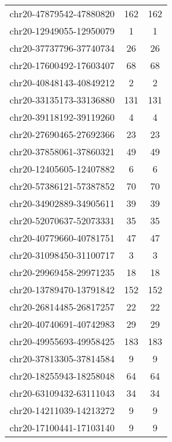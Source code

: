 \begin{longtable}{lSS}
	chr20-47879542-47880820 & 162    & 162                        \\
	chr20-12949055-12950079 & 1      & 1                          \\
	chr20-37737796-37740734 & 26     & 26                         \\
	chr20-17600492-17603407 & 68     & 68                         \\
	chr20-40848143-40849212 & 2      & 2                          \\
	chr20-33135173-33136880 & 131    & 131                        \\
	chr20-39118192-39119260 & 4      & 4                          \\
	chr20-27690465-27692366 & 23     & 23                         \\
	chr20-37858061-37860321 & 49     & 49                         \\
	chr20-12405605-12407882 & 6      & 6                          \\
	chr20-57386121-57387852 & 70     & 70                         \\
	chr20-34902889-34905611 & 39     & 39                         \\
	chr20-52070637-52073331 & 35     & 35                         \\
	chr20-40779660-40781751 & 47     & 47                         \\
	chr20-31098450-31100717 & 3      & 3                          \\
	chr20-29969458-29971235 & 18     & 18                         \\
	chr20-13789470-13791842 & 152    & 152                        \\
	chr20-26814485-26817257 & 22     & 22                         \\
	chr20-40740691-40742983 & 29     & 29                         \\
	chr20-49955693-49958425 & 183    & 183                        \\
	chr20-37813305-37814584 & 9      & 9                          \\
	chr20-18255943-18258048 & 64     & 64                         \\
	chr20-63109432-63111043 & 34     & 34                         \\
	chr20-14211039-14213272 & 9      & 9                          \\
	chr20-17100441-17103140 & 9      & 9                          \\

\end{longtable}
